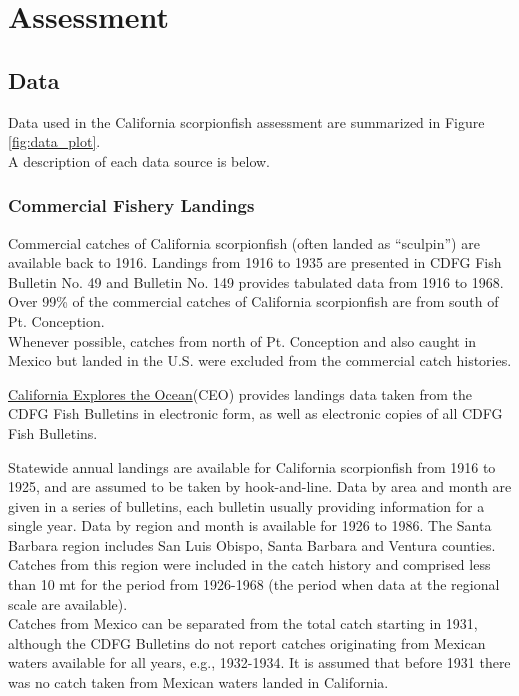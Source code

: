 \documentclass[12pt,]{article}
\begin{document}
\section{Assessment}\label{assessment}

\subsection{Data}\label{data}

Data used in the California scorpionfish assessment are summarized in
Figure \ref{fig:data_plot}.\\
A description of each data source is below.

\subsubsection{Commercial Fishery
Landings}\label{commercial-fishery-landings}

Commercial catches of California scorpionfish (often landed as
``sculpin'') are available back to 1916. Landings from 1916 to 1935 are
presented in CDFG Fish Bulletin No. 49 and Bulletin No. 149 provides
tabulated data from 1916 to 1968. Over 99\% of the commercial catches of
California scorpionfish are from south of Pt. Conception.\\
Whenever possible, catches from north of Pt. Conception and also caught
in Mexico but landed in the U.S. were excluded from the commercial catch
histories.

\href{http://library.ucsd.edu/ceo/fishcatchtables/fish-catch-download.html}{California
Explores the Ocean}(CEO) provides landings data taken from the CDFG Fish
Bulletins in electronic form, as well as electronic copies of all CDFG
Fish Bulletins.

Statewide annual landings are available for California scorpionfish from
1916 to 1925, and are assumed to be taken by hook-and-line. Data by area
and month are given in a series of bulletins, each bulletin usually
providing information for a single year. Data by region and month is
available for 1926 to 1986. The Santa Barbara region includes San Luis
Obispo, Santa Barbara and Ventura counties. Catches from this region
were included in the catch history and comprised less than 10 mt for the
period from 1926-1968 (the period when data at the regional scale are
available).\\
Catches from Mexico can be separated from the total catch starting in
1931, although the CDFG Bulletins do not report catches originating from
Mexican waters available for all years, e.g., 1932-1934. It is assumed
that before 1931 there was no catch taken from Mexican waters landed in
California.
\end{document}
